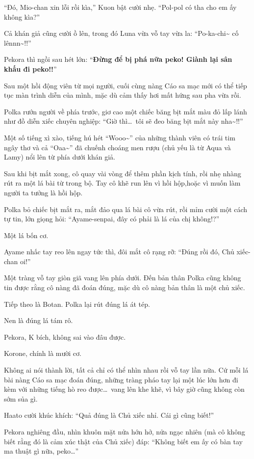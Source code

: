 \documentclass[../main.tex]{subfiles}
\begin{document}
``Đó, Mio-chan xin lỗi rồi kìa,'' Kuon bật cười nhẹ. ``Pol-pol có tha cho em ấy không kìa?''

Cả khán giả cũng cười ồ lên, trong đó Luna vừa vỗ tay vừa la: ``Po-ka-chi\~{} cố lênnn\~{}!!''

Pekora thì ngồi sau hét lớn: ``\textbf{Đừng để bị phá nữa peko! Giành lại sân khấu đi peko!!}''

Sau một hồi động viên từ mọi người, cuối cùng nàng Cáo sa mạc mới có thể tiếp tục màn trình diễn của mình, mặc dù cảm thấy hơi mất hứng sau pha vừa rồi.

Polka rướn người về phía trước, giơ cao một chiếc băng bịt mắt màu đỏ lấp lánh như đồ diễn xiếc chuyên nghiệp: ``Giờ thì\dots\ tôi sẽ đeo băng bịt mắt này nha\~{}!!''

Một số tiếng xì xào, tiếng hú hét ``Wooo\~{}'' của những thành viên có trái tim ngây thơ và cả ``Oaa\~{}'' đã chuếnh choáng men rượu (chủ yếu là từ Aqua và Lamy) nổi lên từ phía dưới khán giả.

Sau khi bịt mắt xong, cô quay vài vòng để thêm phần kịch tính, rồi nhẹ nhàng rút ra một lá bài từ trong bộ. Tay cô khẽ run lên vì hồi hộp,hoặc vì muốn làm người ta tưởng là hồi hộp.

Polka bỏ chiếc bịt mắt ra, mắt đảo qua lá bài cô vừa rút, rồi mỉm cười một cách tự tin, lớn giọng hỏi: ``Ayame-senpai, đây có phải là lá của chị không!?''

Một lá bốn cơ.

Ayame nhấc tay reo lên ngay tức thì, đôi mắt cô rạng rỡ: ``Đúng rồi đó, Chủ xiếc-chan oi!''

Một tràng vỗ tay giòn giã vang lên phía dưới. Đến bản thân Polka cũng không tin được rằng cô nàng đã đoán đúng, mặc dù cô nàng bản thân là một chủ xiếc.

Tiếp theo là Botan. Polka lại rút đúng lá át tép.

Nen là đúng lá tám rô.

Pekora, K bích, không sai vào đâu được.

Korone, chính là mười cơ.

Không ai nói thành lời, tất cả chỉ có thể nhìn nhau rồi vỗ tay lần nữa. Cứ mỗi lá bài nàng Cáo sa mạc đoán đúng, những tràng pháo tay lại một lúc lớn hơn đi kèm với những tiếng hò reo được\dots\ vang lên khe khẽ, vì bây giờ cũng không còn sớm sủa gì.

Haato cười khúc khích: ``Quả đúng là Chủ xiếc nhỉ. Cái gì cũng biết!''

Pekora nghiêng đầu, nhìn khuôn mặt nửa hớn hở, nửa ngạc nhiên (mà cô không biết rằng đó là cảm xúc thật của Chủ xiếc) đáp: ``Không biết em ấy có bàn tay ma thuật gì nữa, peko\dots''
\end{document}
